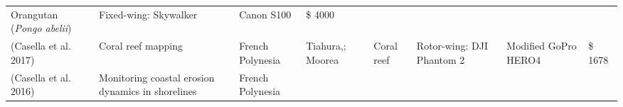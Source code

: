 \documentclass[]{interact}
\theoremstyle{plain}%
\theoremstyle{definition}
\theoremstyle{remark}
\begin{document}
\begin{longtable}[]{@{}llllllll@{}}
\begin{minipage}[t]{0.10\columnwidth}
Orangutan (\emph{Pongo abelii})\strut
\end{minipage} & \begin{minipage}[t]{0.09\columnwidth}\raggedright\strut
Fixed-wing: Skywalker\strut
\end{minipage} & \begin{minipage}[t]{0.11\columnwidth}\raggedright\strut
Canon S100\strut
\end{minipage} & \begin{minipage}[t]{0.01\columnwidth}\raggedright\strut
\$ 4000\strut
\end{minipage}\tabularnewline
\begin{minipage}[t]{0.11\columnwidth}\raggedright\strut
(Casella et al. 2017)\strut
\end{minipage} & \begin{minipage}[t]{0.18\columnwidth}\raggedright\strut
Coral reef mapping\strut
\end{minipage} & \begin{minipage}[t]{0.03\columnwidth}\raggedright\strut
French Polynesia\strut
\end{minipage} & \begin{minipage}[t]{0.14\columnwidth}\raggedright\strut
Tiahura,; Moorea\strut
\end{minipage} & \begin{minipage}[t]{0.10\columnwidth}\raggedright\strut
Coral reef\strut
\end{minipage} & \begin{minipage}[t]{0.09\columnwidth}\raggedright\strut
Rotor-wing: DJI Phantom 2\strut
\end{minipage} & \begin{minipage}[t]{0.11\columnwidth}\raggedright\strut
Modified GoPro HERO4\strut
\end{minipage} & \begin{minipage}[t]{0.01\columnwidth}\raggedright\strut
\$ 1678\strut
\end{minipage}\tabularnewline
\begin{minipage}[t]{0.11\columnwidth}\raggedright\strut
(Casella et al. 2016)\strut
\end{minipage} & \begin{minipage}[t]{0.18\columnwidth}\raggedright\strut
Monitoring coastal erosion dynamics in shorelines\strut
\end{minipage} & \begin{minipage}[t]{0.03\columnwidth}\raggedright\strut
French Polynesia\strut
\end{minipage} & \begin{minipage}[t]{0.14\columnwidth}\raggedright\strut

\end{minipage}
\end{longtable}
\end{document}
